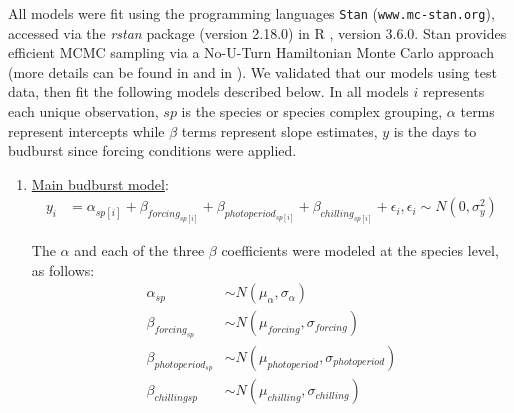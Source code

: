 \documentclass{article}
\begin{document}
\par All models were fit using the programming languages \texttt{Stan} \citep{Carpenter:2016aa}(\texttt{www.mc-stan.org}), accessed via the \textit{rstan} package (version 2.18.0) in R \citep{Rcore:2017,rstan2018}, version 3.6.0. Stan provides efficient MCMC sampling via a No-U-Turn Hamiltonian Monte Carlo approach (more details can be found in \citet{BDA} and in \citet{Carpenter:2016aa}). We validated that our models using test data, then fit the following models described below. In all models $i$ represents each unique observation, $sp$ is the species or species complex grouping, $\alpha$ terms represent intercepts while $\beta$ terms represent slope estimates, $y$ is the days to budburst since forcing conditions were applied.  
\begin{enumerate}
\item \underline{Main budburst model}:
\begin{align*}
y_i &= \alpha_{sp[i]} + \beta_{forcing_{sp[i]}} + \beta_{photoperiod_{sp[i]}} + \beta_{chilling_{sp[i]}} + \epsilon_i, \epsilon_i \sim N(0,\sigma^2_y)
\end{align*}

\noindent The $\alpha$ and each of the three $\beta$ coefficients were modeled at the species level, as follows:
\begin{align*}
\alpha_{sp} & \sim N(\mu_{\alpha}, \sigma_{\alpha}) \\
\beta_{forcing_{sp}} & \sim N(\mu_{forcing}, \sigma_{forcing}) \\
\beta_{photoperiod_{sp}} & \sim N(\mu_{photoperiod}, \sigma_{photoperiod})\\
\beta_{chilling{sp}} & \sim N(\mu_{chilling}, \sigma_{chilling})
\end{align*}


\end{enumerate}
\end{document}
